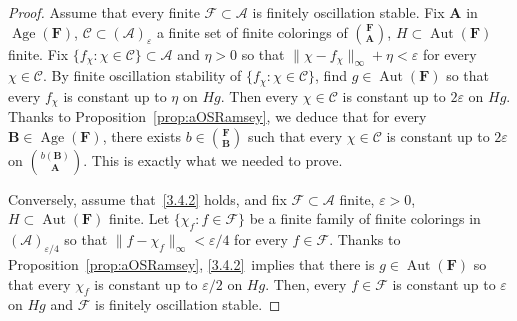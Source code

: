 \documentclass[10pt,a4paper]{article}
\theoremstyle{definition}
\numberwithin{equation}{section}
\numberwithin{figure}{section}
\numberwithin{table}{section}
\newcommand{\A}{\mathcal A}
\newcommand*{\mA}{\mathbf{A}}
\newcommand*{\mB}{\mathbf{B}}
\newcommand*{\mF}{\mathbf{F}}
\newcommand{\e}{\varepsilon}
\DeclareMathOperator{\Aut}{Aut}
\DeclareMathOperator{\Age}{Age}
\begin{document}
\begin{proof}
Assume that every finite $\mathcal F\subset \A$ is finitely oscillation stable. Fix $\mA$ in $\Age(\mF)$, $\mathcal C \subset (\A)_{\e}$ a finite set of finite colorings of $\binom{\mF}{\mA}$, $H\subset \Aut(\mF)$ finite. Fix $\{ f_{\chi}: \chi\in \mathcal C\}\subset \A$ and $\eta >0$ so that $\| \chi - f_{\chi}\|_{\infty}+\eta<\e$ for every $\chi \in \mathcal C$. By finite oscillation stability of $\{ f_{\chi}: \chi\in \mathcal C\}$, find $g\in \Aut(\mF)$ so that every $f_{\chi}$ is constant up to $\eta$ on $Hg$. Then every $\chi \in \mathcal C$ is constant up to $2\e$ on $Hg$. Thanks to Proposition~\ref{prop:aOSRamsey}, we deduce that for every $\mB \in \Age(\mF)$, there exists $b\in \binom{\mF}{\mB}$ such that every $\chi\in \mathcal C$ is constant up to $2\e$ on $\binom{b(\mB)}{\mA}$. This is exactly what we needed to prove.

Conversely, assume that~\eqref{3.4.2} holds, and fix $\mathcal F\subset \mathcal A$ finite, $\e>0$, $H\subset \Aut(\mF)$ finite. Let $\{ \chi_{f} : f\in \mathcal F\}$ be a finite family of finite colorings in $(\A)_{\e/4}$ so that $\| f-\chi_{f}\|_{\infty}<\e/4$ for every $f\in \mathcal F$. Thanks to Proposition~\ref{prop:aOSRamsey}, \eqref{3.4.2}~implies that there is $g\in \Aut(\mF)$ so that every $\chi_{f}$ is constant up to $\e/2$ on $Hg$. Then, every $f\in \mathcal F$ is constant up to $\e$ on $Hg$ and $\mathcal F$ is finitely oscillation stable.
\end{proof}
\end{document}
